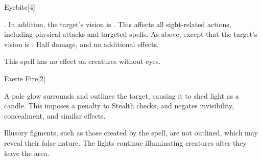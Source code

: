 \begin{spellsection}{Eyebite}[4]
    \begin{spellcontent}
        \begin{spelltargetinginfo}
        \end{spelltargetinginfo}
        \begin{spelleffects}
            \spellsuccess {}. In addition, the target's vision is \impaired. This affects all sight-related actions, including physical attacks and targeted spells.
            \spellcritical As above, except that the target's vision is \severelyimpaired.
            \spellfailure Half damage, and no additional effects.
        \end{spelleffects}
    \end{spellcontent}
    \begin{spellfooter}
        \spellnotes This spell has no effect on creatures without eyes.
        \miscastrandom
    \end{spellfooter}
\end{spellsection}


\begin{spellsection}{Faerie Fire}[2]
    \begin{spellheader}
    \end{spellheader}
    \begin{spellcontent}
        \begin{spelltargetinginfo}
        \end{spelltargetinginfo}
        \begin{spelleffects}
            \spelleffect A pale glow surrounds and outlines the target, causing it to shed light as a candle. This imposes a  penalty to Stealth checks, and negates invisibility, concealment, and similar effects. 
            \spelldur \durshort \dismissable
        \end{spelleffects}
    \end{spellcontent}
    \begin{spellfooter}
        \spellnotes Illusory figments, such as those created by the  spell, are not outlined, which may reveal their false nature. The lights continue illuminating creatures after they leave the area.
        \miscastyou
    \end{spellfooter}
\end{spellsection}

